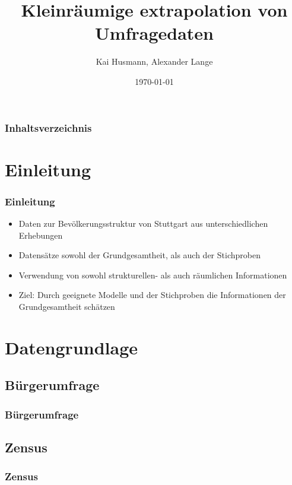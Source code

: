 \documentclass{beamer}
\begin{document}


\title{Kleinräumige extrapolation von Umfragedaten}   
\author{Kai Husmann, Alexander Lange} 
\date{\today}

\begin{frame}
\titlepage
\end{frame}

\begin{frame}
\frametitle{Inhaltsverzeichnis}\tableofcontents
\end{frame}


\section{Einleitung}
\begin{frame}\frametitle{Einleitung} 
\begin{itemize}
\item Daten zur Bevölkerungsstruktur von Stuttgart aus unterschiedlichen Erhebungen
\item Datensätze sowohl der Grundgesamtheit, als auch der Stichproben 
\item Verwendung von sowohl strukturellen- als auch räumlichen Informationen
\item Ziel: Durch geeignete Modelle und der Stichproben die Informationen der Grundgesamtheit schätzen
\end{itemize}
\end{frame}


\section{Datengrundlage} 

\subsection{Bürgerumfrage}
\begin{frame}\frametitle{Bürgerumfrage}

\end{frame}


\subsection{Zensus}
\begin{frame}\frametitle{Zensus}


\end{frame}
\end{document}
